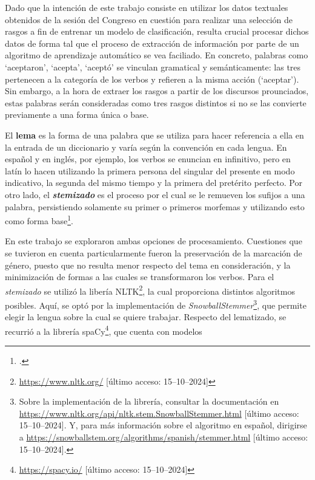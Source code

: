 Dado que la intenci\'on de este trabajo consiste en utilizar los datos textuales
obtenidos de la sesi\'on del Congreso en cuesti\'on para realizar una selecci\'on
de rasgos a fin de entrenar un modelo de clasificaci\'on, resulta crucial procesar dichos
datos de forma tal que el proceso de extracci\'on de informaci\'on por parte
de un algoritmo de aprendizaje autom\'atico se vea faciliado. En concreto, palabras
como `aceptaron', `acepta', `acept\'o' se vinculan gramatical y sem\'anticamente:
las tres pertenecen a la categor\'ia de los verbos y refieren a la misma acci\'on (`aceptar').
Sin embargo, a la hora de extraer los rasgos a partir de los discursos prounciados,
estas palabras ser\'an consideradas como tres rasgos distintos si no se las convierte
previamente a una forma \'unica o base.
\par
El \textbf{lema} es la forma de una palabra que se utiliza para hacer referencia a ella
en la entrada de un diccionario y var\'ia seg\'un la convenci\'on en cada lengua. En español
y en ingl\'es, por ejemplo, los verbos se enuncian en infinitivo, pero en lat\'in lo hacen
utilizando la primera persona del singular del presente en modo indicativo, la segunda
del mismo tiempo y la primera del pret\'erito perfecto. Por otro lado, el
\textbf{\textit{stemizado}} es el proceso por el cual se le remueven los sufijos
a una palabra, persistiendo solamente su primer o primeros morfemas y utilizando
esto como forma base\footnote{\citet[Cap\'itulo~3]{bird2009natural}.}.
\par
En este trabajo se exploraron ambas opciones de procesamiento. Cuestiones que se tuvieron
en cuenta particularmente fueron la preservaci\'on de la marcaci\'on de g\'enero, puesto que
no resulta menor respecto del tema en consideraci\'on, y la minimizaci\'on de formas a las
cuales se transformaron los verbos. Para el \textit{stemizado} se utiliz\'o la
liber\'ia NLTK\footnote{\url{https://www.nltk.org/} [\'ultimo acceso: 15--10--2024]},
la cual proporciona distintos algoritmos posibles. Aqu\'i, se opt\'o por la
implementaci\'on de \textit{SnowballStemmer}\footnote{Sobre la implementaci\'on de la
librer\'ia, consultar la documentaci\'on en
\url{https://www.nltk.org/api/nltk.stem.SnowballStemmer.html}
[\'ultimo acceso: 15--10--2024]. Y, para m\'as informaci\'on
sobre el algoritmo en español, dirigirse a
\url{https://snowballstem.org/algorithms/spanish/stemmer.html}
[\'ultimo acceso: 15--10--2024].}, que permite elegir
la lengua sobre la cual se quiere trabajar. Respecto del lematizado, se recurri\'o
a la librer\'ia spaCy\footnote{\url{https://spacy.io/}
[\'ultimo acceso: 15--10--2024]}, que cuenta con modelos
